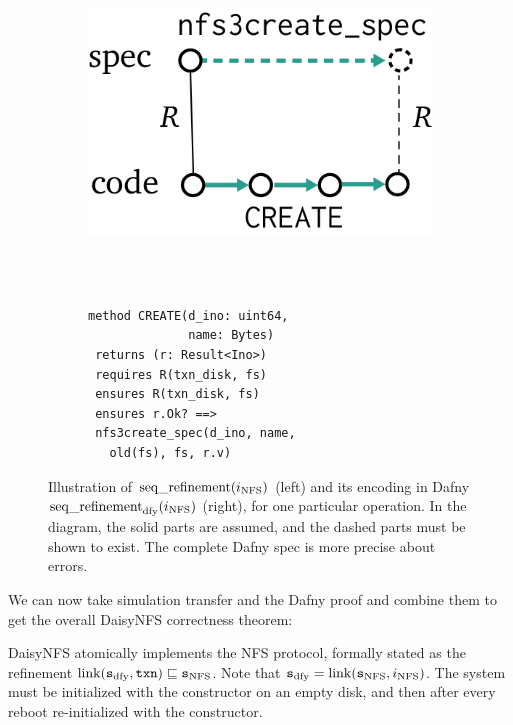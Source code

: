\begin{figure}
  \centering
  \begin{subfigure}{0.25\textwidth}
    \includegraphics{fig/sequential-refinement.png}
  \end{subfigure}~~~~~\vrule~~~~%
\begin{subfigure}{0.3\textwidth}
  {\small
\begin{verbatim}

method CREATE(d_ino: uint64,
              name: Bytes)
 returns (r: Result<Ino>)
 requires R(txn_disk, fs)
 ensures R(txn_disk, fs)
 ensures r.Ok? ==>
 nfs3create_spec(d_ino, name,
   old(fs), fs, r.v)
\end{verbatim}
}
\end{subfigure}
\vspace{0.5\baselineskip}
  \caption[Illustration of sequential refinement and its Dafny encoding]%
  {Illustration of $\operatorname{seq\_refinement}(i_{\mathrm{NFS}})$ (left) and its encoding
in Dafny $\operatorname{seq\_refinement}_{\mathrm{dfy}}(i_{\mathrm{NFS}})$ (right), for one particular operation.
In the diagram, the solid parts are assumed, and the
dashed parts must be shown to exist. The complete Dafny spec is more precise about
errors.}
  \label{fig:refinement}
\end{figure}

\setcounter{theorem}{0}

We can now take simulation transfer and the Dafny proof and combine them to get
the overall DaisyNFS correctness theorem:
\begin{theorem}
  DaisyNFS atomically implements the NFS protocol, formally stated as the
  refinement $\mathrm{link}(\texttt{s}_{\mathrm{dfy}}, \texttt{txn}) \sqsubseteq \texttt{s}_{\mathrm{NFS}}$. Note that
  $\texttt{s}_{\mathrm{dfy}} = \mathrm{link}(\texttt{s}_{\mathrm{NFS}}, i_{\mathrm{NFS}})$. The system must be initialized with the
   constructor on an empty disk, and then after every reboot
  re-initialized with the  constructor.
  \label{thm:daisy-correctness-restatement}
\end{theorem}

